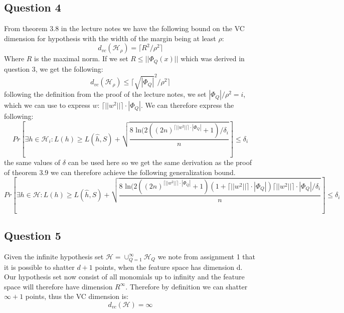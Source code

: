 \documentclass{article}
\begin{document}
\subsection{Question 4}
From theorem 3.8 in the lecture notes we have the following bound on the VC dimension for hypothesis with the width of the margin being at least $\rho$:
\begin{equation}
d_{vc}(\mathcal{H}_\rho) = \lceil R^2 / \rho^2 \rceil
\end{equation}
Where $R$ is the maximal norm. If we set $R \leq || \Phi_Q(x)||$ which was derived in question 3, we get the following:
\begin{equation}
d_{vc}(\mathcal{H}_\rho) \leq \lceil \sqrt{| \Phi_Q|}^2  / \rho^2 \rceil
\end{equation}
following the definition from the proof of the lecture notes, we set $
| \Phi_Q| / \rho^2 = i$, which we can use to express $w$: $\lceil || w^2|| \rceil \cdot| \Phi_Q|$. We can therefore express the following:
\begin{equation}
Pr \left[ \exists h \in \mathcal{H}_i: L(h) \geq L(\hat{h},S)+
\sqrt{ \dfrac{8 \text{ ln} (2((2n)^{\lceil || w^2|| \rceil \cdot| \Phi_Q|}+1) / \delta_i}{n}} \right] \leq \delta_i 
\end{equation}
the same values of $\delta$ can be used here so we get the same derivation as the proof of theorem 3.9 we can therefore achieve the following generalization bound.
\begin{equation}
Pr \left[ \exists h \in \mathcal{H}: L(h) \geq L(\hat{h},S)+
\sqrt{ \dfrac{8 \text{ ln} (2((2n)^{\lceil || w^2|| \rceil \cdot| \Phi_Q|}+1) (1+ \lceil || w^2|| \rceil \cdot| \Phi_Q|) \lceil || w^2|| \rceil \cdot| \Phi_Q|  / \delta_i}{n}} \right] \leq \delta_i 
\end{equation}
\subsection{Question 5}
Given the infinite hypothesis set $\mathcal{H} = \cup_{Q=1}^\infty \mathcal{H}_Q$ we note from assignment 1 that it is possible to shatter $d+1$ points, when the feature space has dimension d. Our hypothesis set now consist of all monomials  up to infinity and the feature space will therefore have dimension $R^\infty$. Therefore by definition we can shatter $\infty +1$ points, thus the VC dimension is:
$$ d_{vc}(\mathcal{H}) = \infty $$
\end{document}
